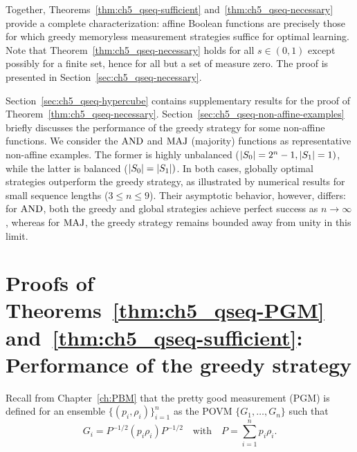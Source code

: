 Together, Theorems~\ref{thm:ch5_qseq-sufficient} and~\ref{thm:ch5_qseq-necessary} provide a complete characterization: affine Boolean functions are precisely those for which greedy memoryless measurement strategies suffice for optimal learning.
Note that Theorem~\ref{thm:ch5_qseq-necessary} holds for all $s \in (0,1)$ except possibly for a finite set, hence for all but a set of measure zero.
The proof is presented in Section~\ref{sec:ch5_qseq-necessary}.

Section~\ref{sec:ch5_qseq-hypercube} contains supplementary results for the proof of Theorem~\ref{thm:ch5_qseq-necessary}.
Section~\ref{sec:ch5_qseq-non-affine-examples} briefly discusses the performance of the greedy strategy for some non-affine functions.
We consider the $\mathrm{AND}$ and $\mathrm{MAJ}$ (majority) functions as representative non-affine examples.
The former is highly unbalanced ($\abs{S_0}=2^n-1, \abs{S_1}=1)$, while the latter is balanced ($\abs{S_0}=\abs{S_1})$.
In both cases, globally optimal strategies outperform the greedy strategy, as illustrated by numerical results for small sequence lengths ($3\le n\le 9$).
Their asymptotic behavior, however, differs: for $\mathrm{AND}$, both the greedy and global strategies achieve perfect success as $n\to\infty$, whereas for $\mathrm{MAJ}$, the greedy strategy remains bounded away from unity in this limit.

\section{Proofs of Theorems~\ref{thm:ch5_qseq-PGM} and~\ref{thm:ch5_qseq-sufficient}: Performance of the greedy strategy}\label{sec:ch5_qseq-easy-proofs}

Recall from Chapter~\ref{ch:PBM} that the pretty good measurement (PGM) is defined for an ensemble $\{(p_i, \rho_i)\}_{i=1}^n$ as the POVM $\{G_1, \ldots, G_n\}$ such that
\begin{equation*}
    G_i = P^{-1/2} \left( p_i \rho_i \right) P^{-1/2} \quad \text{with} \quad P = \sum_{i=1}^n p_i \rho_i.
\end{equation*}


